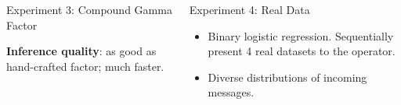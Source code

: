 \documentclass[english]{beamer}
\begin{document}
\begin{frame}
\begin{columns}[t]
\begin{block}{ Experiment 3: Compound Gamma Factor }
\begin{figure}[ht]
{  %
  }
  \hspace{1.8cm}
  \label{fig:cg_performance}
\end{figure}

\vspace{5mm}

\textbf{Inference quality}: as good as hand-crafted factor; much faster.
\end{block}

\begin{block}{ Experiment 4: Real Data}
\begin{itemize}
    \item Binary logistic regression.  Sequentially present 4 real datasets
        to the operator.
    \item Diverse distributions of incoming messages.
\end{itemize}


\end{block}
\end{columns}
\end{frame}
\end{document}
